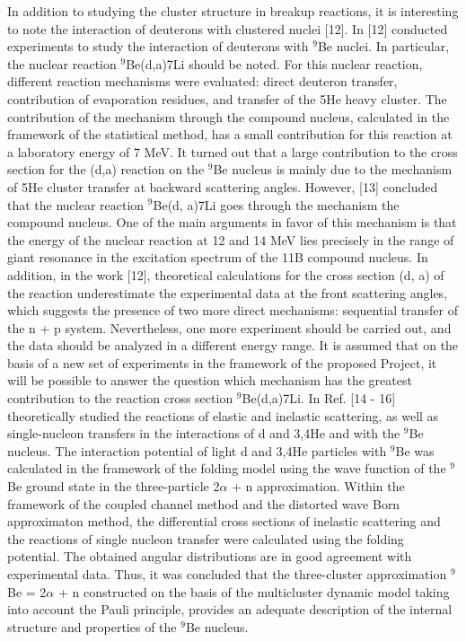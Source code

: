 \documentclass[
12pt, %
oneside, %
english, %
onehalfspacing, %
onehalfspacing, %
headsepline, %
]{MastersDoctoralThesis} %
\begin{document}
In addition to studying the cluster structure in breakup reactions, it is interesting to note the interaction of deuterons with clustered nuclei [12]. In [12] conducted experiments to study the interaction of deuterons with $^{9}$Be nuclei. In particular, the nuclear reaction $^{9}$Be(d,a)7Li should be noted. For this nuclear reaction, different reaction mechanisms were evaluated: direct deuteron transfer, contribution of evaporation residues, and transfer of the 5He heavy cluster. The contribution of the mechanism through the compound nucleus, calculated in the framework of the statistical method, has a small contribution for this reaction at a laboratory energy of 7 MeV. It turned out that a large contribution to the cross section for the (d,a) reaction on the $^{9}$Be nucleus is mainly due to the mechanism of 5He cluster transfer at backward scattering angles. However, [13] concluded that the nuclear reaction $^{9}$Be(d, a)7Li goes through the mechanism the compound nucleus. One of the main arguments in favor of this mechanism is that the energy of the nuclear reaction at 12 and 14 MeV lies precisely in the range of giant resonance in the excitation spectrum of the 11B compound nucleus. In addition, in the work [12], theoretical calculations for the cross section (d, a) of the reaction underestimate the experimental data at the front scattering angles, which suggests the presence of two more direct mechanisms: sequential transfer of the n + p system. Nevertheless, one more experiment should be carried out, and the data should be analyzed in a different energy range. It is assumed that on the basis of a new set of experiments in the framework of the proposed Project, it will be possible to answer the question which mechanism has the greatest contribution to the reaction cross section $^{9}$Be(d,a)7Li.
In Ref. [14 - 16] theoretically studied the reactions of elastic and inelastic scattering, as well as single-nucleon transfers in the interactions of d and 3,4He and with the $^{9}$Be nucleus. The interaction potential of light d and 3,4He particles with $^{9}$Be was calculated in the framework of the folding model using the wave function of the $^{9}$Be ground state in the three-particle 2$\alpha$ + n approximation. Within the framework of the coupled channel method and the distorted wave Born approximaton method, the differential cross sections of inelastic scattering and the reactions of single nucleon transfer were calculated using the folding potential. The obtained angular distributions are in good agreement with experimental data. Thus, it was concluded that the three-cluster approximation $^{9}$Be = 2$\alpha$ + n constructed on the basis of the multicluster dynamic model taking into account the Pauli principle, provides an adequate description of the internal structure and properties of the $^{9}$Be nucleus.  
\end{document}
